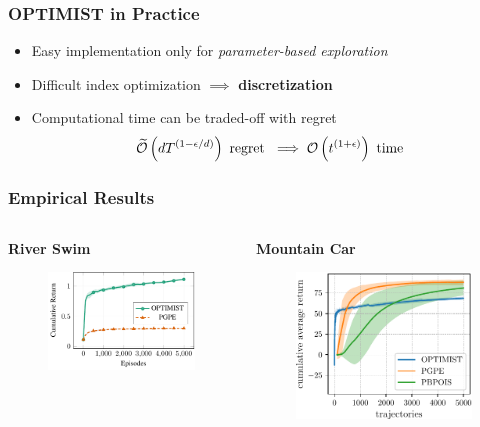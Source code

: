 \documentclass[aspectratio=169, table]{beamer}
\newcommand{\eno}[1]{\textcolor{orangep}{\textbf{#1}}}
\begin{document}
\begin{frame} 
\frametitle{OPTIMIST in Practice}
\begin{itemize}
	\setlength{\itemsep}{20pt}
	\item Easy implementation only for \emph{parameter-based exploration}~\cite{sehnke2008policy}
	\item Difficult index optimization $\implies$ \eno{discretization}
	\item Computational time can be traded-off with regret
	\[
		\widetilde{\mathcal{O}}\left(dT^{(1-\epsilon/d)}\right) \text{ regret } \implies \mathcal{O}\left(t^{(1+\epsilon)}\right) \text{ time }
	\]
\end{itemize}
\end{frame}

\begin{frame}
\frametitle{Empirical Results} 
\begin{columns}
	\begin{column}{.5\textwidth}
		\centering
		{\bf River Swim}
		\begin{figure}
			\includegraphics[width=\textwidth]{river.pdf}
		\end{figure}
	\end{column}
\hfill
	\begin{column}{.45\textwidth}
		\centering
		{\bf Mountain Car}
		\begin{figure}
			\includegraphics[width=\textwidth]{MC_mu.pdf}

\end{figure}
\end{column}
\end{columns}
\end{frame}
\end{document}
